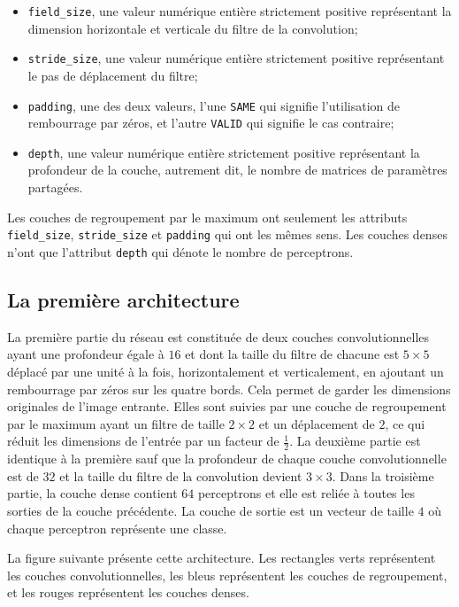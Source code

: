 \begin{itemize}
  \item \texttt{field\_size}, une valeur numérique entière strictement positive
  représentant la dimension horizontale et verticale du filtre de la convolution;
  \item \texttt{stride\_size}, une valeur numérique entière strictement positive
  représentant le pas de déplacement du filtre;
  \item \texttt{padding}, une des deux valeurs, l'une \texttt{SAME} qui signifie
  l'utilisation de rembourrage par zéros, et l'autre \texttt{VALID} qui signifie le cas
  contraire;
  \item \texttt{depth}, une valeur numérique entière strictement positive représentant
  la profondeur de la couche, autrement dit, le nombre de matrices de paramètres
  partagées.
\end{itemize}

Les couches de regroupement par le maximum ont seulement les attributs \texttt{field\_size},
\texttt{stride\_size} et \texttt{padding} qui ont les mêmes sens. Les couches denses
n'ont que l'attribut \texttt{depth} qui dénote le nombre de perceptrons.

\subsection{La première architecture}

La première partie du réseau est constituée de deux couches convolutionnelles
ayant une profondeur égale à $16$ et dont la taille du filtre de chacune est
$5 \times 5$ déplacé par une unité à la fois, horizontalement et verticalement,
en ajoutant un rembourrage par zéros sur les quatre bords. Cela permet de garder
les dimensions originales de l'image entrante.
Elles sont suivies par une couche de regroupement par le maximum ayant un filtre
de taille $2 \times 2$ et un déplacement de $2$, ce qui réduit les dimensions de
l'entrée par un facteur de $\frac{1}{2}$. La deuxième partie est
identique à la première sauf que la profondeur de chaque couche convolutionnelle
est de $32$ et la taille du filtre de la convolution devient $3 \times 3$. Dans la
troisième partie, la couche dense contient $64$ perceptrons et elle est reliée
à toutes les sorties de la couche précédente. La couche de sortie est un
vecteur de taille $4$ où chaque perceptron représente une classe.

La figure suivante présente cette architecture. Les rectangles verts représentent
les couches convolutionnelles, les bleus représentent les couches de regroupement,
et les rouges représentent les couches denses.

